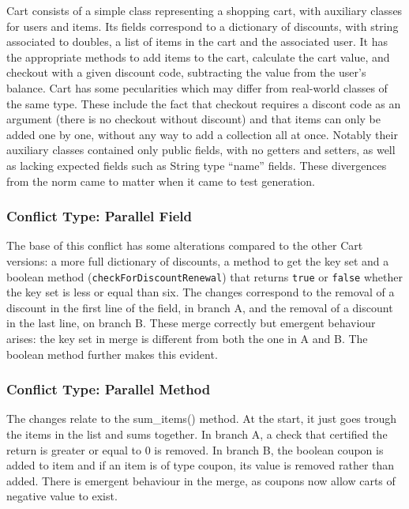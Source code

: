 Cart consists of a simple class representing a shopping cart, with auxiliary classes for users and items.
Its fields correspond to a dictionary of discounts, with string associated to doubles, a list of items in the cart
and the associated user.
It has the appropriate methods to add items to the cart, calculate the cart value, and checkout with a given discount code,
subtracting the value from the user's balance.
Cart has some pecularities which may differ from real-world classes of the same type. These include the fact that checkout
requires a discont code as an argument (there is no checkout without discount) and that items can only be added one by one, without
any way to add a collection all at once.  Notably their auxiliary classes contained only public fields, with no getters and setters, as
well as lacking expected fields such as String type ``name'' fields. These divergences from the norm came to matter when it came to
test generation.

\subsubsection{Conflict Type: Parallel Field}

The base of this conflict has some alterations compared to the other Cart versions: a more full dictionary of discounts,
a method to get the key set and a boolean method (\texttt{checkForDiscountRenewal}) that returns \texttt{true} or \texttt{false} whether the key set is less or equal than six.
The changes correspond to the removal of a discount in the first line of the field, in branch A, and the removal of a discount in the last line, on branch B.
These merge correctly but emergent behaviour arises: the key set in merge is different from both the one in A and B.
The boolean method further makes this evident.

\subsubsection{Conflict Type: Parallel Method}

The changes relate to the sum\_items() method. At the start, it just goes trough the items in the list and sums together. In branch A,
a check that certified the return is greater or equal to 0 is removed. In branch B, the boolean coupon is added to item and if an item
is of type coupon, its value is removed rather than added. There is emergent behaviour in the merge, as coupons now allow carts of negative
value to exist.

